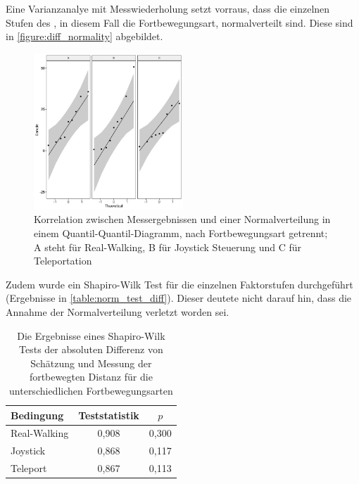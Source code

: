                     Eine Varianzanalye mit Messwiederholung setzt vorraus, dass die einzelnen Stufen des , in diesem Fall die Fortbewegungsart, normalverteilt sind. Diese sind in \autoref{figure:diff_normality} abgebildet.

                    \begin{figure}[!h]
                        \centering
                        \includegraphics[width=0.5\textwidth]{plots/diff_normality.png}
                        \caption{Korrelation zwischen Messergebnissen und einer Normalverteilung in einem Quantil-Quantil-Diagramm, nach Fortbewegungsart getrennt; A steht für Real-Walking, B für Joystick Steuerung und C für Teleportation}\label{figure:diff_normality}
                    \end{figure}

                    Zudem wurde ein Shapiro-Wilk Test für die einzelnen Faktorstufen durchgeführt (Ergebnisse in \autoref{table:norm_test_diff}). Dieser deutete nicht darauf hin, dass die Annahme der Normalverteilung verletzt worden sei.

                    \begin{table}[!h]
                        \renewcommand\arraystretch{1.2}
                        \centering
                        \begin{tabular}{lcc} \toprule
                            Bedingung    & Teststatistik    & $p$   \\ \midrule
                            Real-Walking & 0,908            & 0,300 \\
                            Joystick     & 0,868            & 0,117 \\
                            Teleport     & 0,867            & 0,113 \\ \bottomrule
                        \end{tabular}
                        \caption{Die Ergebnisse eines Shapiro-Wilk Tests der absoluten Differenz von Schätzung und Messung der fortbewegten Distanz für die unterschiedlichen Fortbewegungsarten}\label{table:norm_test_diff}
                    \end{table}

